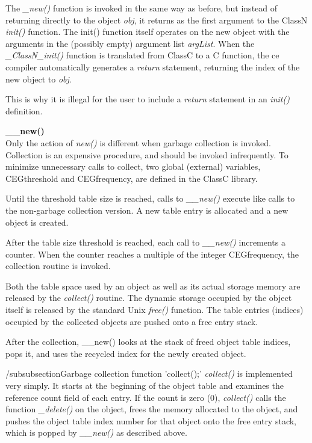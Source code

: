 The {\em \_new()} function is invoked in the same way as before,
but instead of returning
directly to the object {\em obj}, it returns as the first argument to the
ClassN {\em init()} function.  The init() function itself operates on the new
object with the arguments in the (possibly empty) argument list {\em argList}.
When the {\em \_ClassN\_init()} function is translated from ClassC to a C
function, the ce compiler automatically generates a {\em return} statement,
returning the index of the new object to {\em obj}.

This is why it is illegal for the user to include a {\em return} statement in
an {\em init()} definition.

{\noindent \flushleft \bf \_\_new()\\}
Only the action of {\em new()} is different when garbage collection is invoked.
Collection is an expensive procedure, and should be invoked infrequently.
To minimize unnecessary calls to collect, two global (external) variables,
CEGthreshold and CEGfrequency, are defined in the ClassC library.

Until the threshold table size is reached, calls to {\em \_\_new()} execute like
calls to the non-garbage collection version.  A new table entry is
allocated and a new object is created.

After the table size threshold is reached, each call to {\em \_\_new()}
increments a counter.  When the counter reaches a multiple of the
integer CEGfrequency, the collection routine is invoked.

Both the table space used by an object as well as its actual storage memory
are released by the {\em collect()} routine.  The dynamic storage occupied by
the object itself is released by the standard Unix {\em free()} function.
The table entries (indices) occupied by the collected objects are pushed
onto a free entry stack.

After the collection, \_\_new() looks at
the stack of freed object table indices, pops it, and uses the recycled index
for the newly created object.

/subsubsection{Garbage collection function 'collect();'}
{\em collect()} is implemented very simply.  It starts at the beginning of the
object table and examines the reference count field of each entry.  If
the count is zero (0), {\em collect()} calls the function {\em \_delete()}
on the
object, frees the memory allocated to the object, and pushes the object
table index number for that object onto the free entry stack, which is
popped by {\em \_\_new()} as described above.

